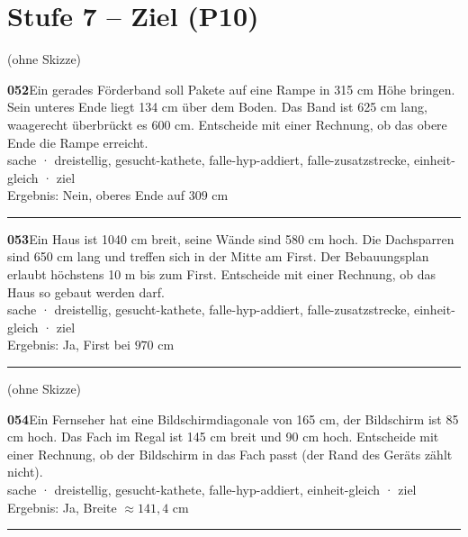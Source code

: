 \documentclass[10pt]{article}
\begin{document}
\section*{Stufe 7 – Ziel (P10)}
\begin{minipage}[t]{\linewidth}
\parbox[t]{5.8cm}{\parbox[t]{5.5cm}{\color{gray}\small (ohne Skizze)}}\hfill\parbox[t]{11.6cm}{\textbf{052}\quad Ein gerades Förderband soll Pakete auf eine Rampe in 315 cm Höhe bringen. Sein unteres Ende liegt 134 cm über dem Boden. Das Band ist 625 cm lang, waagerecht überbrückt es 600 cm. Entscheide mit einer Rechnung, ob das obere Ende die Rampe erreicht.\\[2pt]{\color{gray}\footnotesize sache · dreistellig, gesucht-kathete, falle-hyp-addiert, falle-zusatzstrecke, einheit-gleich · ziel\\Ergebnis: Nein, oberes Ende auf $309$ cm}}
\end{minipage}\par\medskip\hrule\medskip
\begin{minipage}[t]{\linewidth}
\parbox[t]{5.8cm}{}\hfill\parbox[t]{11.6cm}{\textbf{053}\quad Ein Haus ist 1040 cm breit, seine Wände sind 580 cm hoch. Die Dachsparren sind 650 cm lang und treffen sich in der Mitte am First. Der Bebauungsplan erlaubt höchstens 10 m bis zum First. Entscheide mit einer Rechnung, ob das Haus so gebaut werden darf.\\[2pt]{\color{gray}\footnotesize sache · dreistellig, gesucht-kathete, falle-hyp-addiert, falle-zusatzstrecke, einheit-gleich · ziel\\Ergebnis: Ja, First bei $970$ cm}}
\end{minipage}\par\medskip\hrule\medskip
\begin{minipage}[t]{\linewidth}
\parbox[t]{5.8cm}{\parbox[t]{5.5cm}{\color{gray}\small (ohne Skizze)}}\hfill\parbox[t]{11.6cm}{\textbf{054}\quad Ein Fernseher hat eine Bildschirmdiagonale von 165 cm, der Bildschirm ist 85 cm hoch. Das Fach im Regal ist 145 cm breit und 90 cm hoch. Entscheide mit einer Rechnung, ob der Bildschirm in das Fach passt (der Rand des Geräts zählt nicht).\\[2pt]{\color{gray}\footnotesize sache · dreistellig, gesucht-kathete, falle-hyp-addiert, einheit-gleich · ziel\\Ergebnis: Ja, Breite $\approx 141{,}4$ cm}}
\end{minipage}\par\medskip\hrule\medskip
\end{document}
